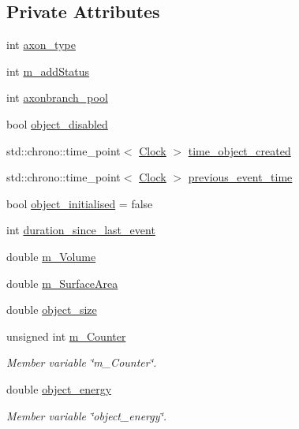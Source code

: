 \subsection*{Private Attributes}
\begin{DoxyCompactItemize}
\item 
int \mbox{\hyperlink{classAxon_abbd92e8cf3ef8204baab98e7cbb08c64}{axon\+\_\+type}}
\item 
int \mbox{\hyperlink{classAxon_a4ad266c581741a63bf0c495a35ee3eff}{m\+\_\+add\+Status}}
\item 
int \mbox{\hyperlink{classAxon_a1be97ce73a4e60afb25798c397610be5}{axonbranch\+\_\+pool}}
\item 
bool \mbox{\hyperlink{classAxon_adc8989011b569ae1227a47f83f419694}{object\+\_\+disabled}}
\item 
std\+::chrono\+::time\+\_\+point$<$ \mbox{\hyperlink{universe_8h_a0ef8d951d1ca5ab3cfaf7ab4c7a6fd80}{Clock}} $>$ \mbox{\hyperlink{classAxon_a01b83a46da58746087de2c6f1dd30405}{time\+\_\+object\+\_\+created}}
\item 
std\+::chrono\+::time\+\_\+point$<$ \mbox{\hyperlink{universe_8h_a0ef8d951d1ca5ab3cfaf7ab4c7a6fd80}{Clock}} $>$ \mbox{\hyperlink{classAxon_a3270d8b1bf8875da361ea6e7dd46d8f1}{previous\+\_\+event\+\_\+time}}
\item 
bool \mbox{\hyperlink{classAxon_a171c967b604d668f118d3c857d23593d}{object\+\_\+initialised}} = false
\item 
int \mbox{\hyperlink{classAxon_a9aae3819e2bb13084966b70b242c8745}{duration\+\_\+since\+\_\+last\+\_\+event}}
\item 
double \mbox{\hyperlink{classAxon_a6cfb696bb484732e6d9d4c25cb4ccc7c}{m\+\_\+\+Volume}}
\item 
double \mbox{\hyperlink{classAxon_ae0e1d436b8ef9fd1007815ffc2e66e77}{m\+\_\+\+Surface\+Area}}
\item 
double \mbox{\hyperlink{classAxon_a2e5391cbc38b47b56265bc0e3d1129c8}{object\+\_\+size}}
\item 
unsigned int \mbox{\hyperlink{classAxon_a83973df45e4d3b58ca80e1ff27f69a90}{m\+\_\+\+Counter}}
\begin{DoxyCompactList}\small\item\em Member variable \char`\"{}m\+\_\+\+Counter\char`\"{}. \end{DoxyCompactList}\item 
double \mbox{\hyperlink{classAxon_a14fb0a3f9b06f6f68dd884e3ac82f828}{object\+\_\+energy}}
\begin{DoxyCompactList}\small\item\em Member variable \char`\"{}object\+\_\+energy\char`\"{}. \end{DoxyCompactList}\item 

\end{DoxyCompactItemize}
